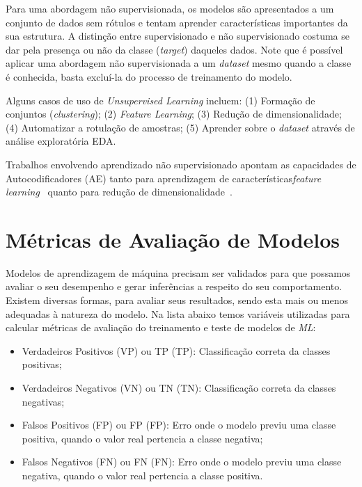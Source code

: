 Para uma abordagem não supervisionada, os modelos são apresentados a um conjunto de dados sem rótulos e tentam aprender características importantes da sua estrutura. A distinção entre supervisionado e não supervisionado costuma se dar pela presença ou não da classe (\textit{target}) daqueles dados. Note que é possível aplicar uma abordagem não supervisionada a um \textit{dataset} mesmo quando a classe é conhecida, basta excluí-la do processo de treinamento do modelo.

Alguns casos de uso de \textit{Unsupervised Learning} incluem: (1) Formação de conjuntos (\textit{clustering}); (2) \textit{Feature Learning}; (3) Redução de dimensionalidade; (4) Automatizar a rotulação de amostras; (5) Aprender sobre o \textit{dataset} através de análise exploratória \acrlong{EDA}.

Trabalhos envolvendo aprendizado não supervisionado apontam as capacidades de Autocodificadores (\acrshort{AE}) tanto para aprendizagem de características\textit{feature learning}~\cite{35.16, 35.17} quanto para redução de dimensionalidade~\cite{35.18, 35.19}.


\section{Métricas de Avaliação de Modelos}\label{sec:metricas}

Modelos de aprendizagem de máquina precisam ser validados para que possamos avaliar o seu desempenho e gerar inferências a respeito do seu comportamento. Existem diversas formas, para avaliar seus resultados, sendo esta mais ou menos adequadas à natureza do modelo. Na lista abaixo temos variáveis utilizadas para calcular métricas de avaliação do treinamento e teste de modelos de \textit{ML}:

\begin{itemize}
    \item Verdadeiros Positivos (VP) ou \acrlong{TP} (\acrshort{TP}): Classificação correta da classes positivas;
    \item Verdadeiros Negativos (VN) ou \acrlong{TN} (\acrshort{TN}): Classificação correta da classes negativas;
    \item Falsos Positivos (FP) ou \acrlong{FP} (\acrshort{FP}): Erro onde o modelo previu uma classe positiva, quando o valor real pertencia a classe negativa;
    \item Falsos Negativos (FN) ou \acrlong{FN} (\acrshort{FN}): Erro onde o modelo previu uma classe negativa, quando o valor real pertencia a classe positiva.
\end{itemize}

